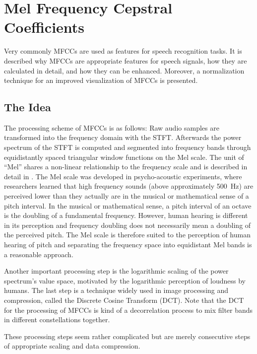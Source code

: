 
\section{Mel Frequency Cepstral Coefficients}\label{sec:signal_mfcc}
Very commonly MFCCs are used as features for speech recognition tasks.
It is described why MFCCs are appropriate features for speech signals, how they are calculated in detail, and how they can be enhanced.
Moreover, a normalization technique for an improved visualization of MFCCs is presented.



\subsection{The Idea}
The processing scheme of MFCCs \cite{Mermelstein1980} is as follows:
Raw audio samples are transformed into the frequency domain with the STFT.
Afterwards the power spectrum of the STFT is computed and segmented into frequency bands through equidistantly spaced triangular window functions on the Mel scale.
The unit of \enquote{Mel} shares a non-linear relationship to the frequency scale and is described in detail in .
The Mel scale was developed in psycho-acoustic experiments, where researchers learned that high frequency sounds (above approximately \SI{500}{\hertz}) are perceived lower than they actually are in the musical or mathematical sense of a pitch interval.
In the musical or mathematical sense, a pitch interval of an octave is the doubling of a fundamental frequency.
However, human hearing is different in its perception and frequency doubling does not necessarily mean a doubling of the perceived pitch.
The Mel scale is therefore suited to the perception of human hearing of pitch and separating the frequency space into equidistant Mel bands is a reasonable approach.

Another important processing step is the logarithmic scaling of the power spectrum's value space, motivated by the logarithmic perception of loudness by humans.
The last step is a technique widely used in image processing and compression, called the Discrete Cosine Transform (DCT).
Note that the DCT for the processing of MFCCs is kind of a decorrelation process to mix filter bands in different constellations together.

These processing steps seem rather complicated but are merely consecutive steps of appropriate scaling and data compression.


